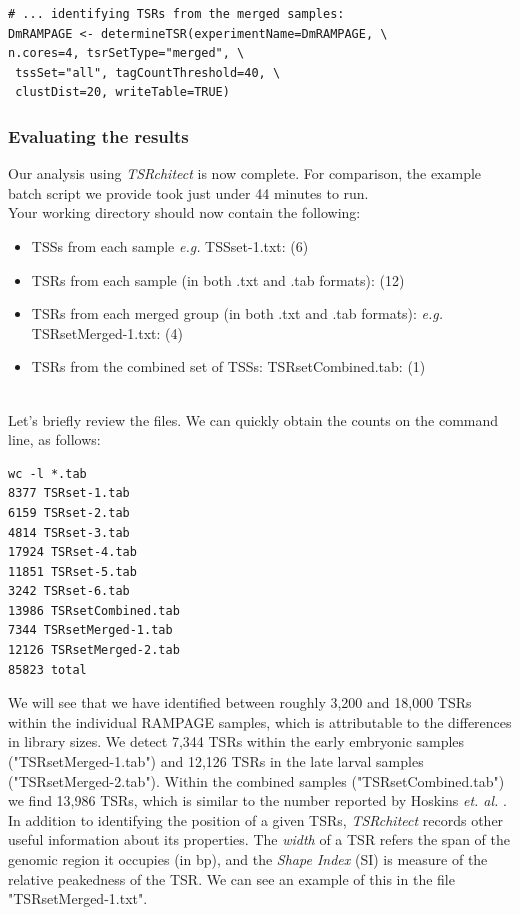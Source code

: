\documentclass[runningheads,a4paper]{llncs}
\begin{document}
\begin{linenumbers}
\begin{verbatim}
# ... identifying TSRs from the merged samples:
DmRAMPAGE <- determineTSR(experimentName=DmRAMPAGE, \
n.cores=4, tsrSetType="merged", \
 tssSet="all", tagCountThreshold=40, \
 clustDist=20, writeTable=TRUE)
\end{verbatim}

\subsubsection{Evaluating the results}
Our analysis using \textit{TSRchitect} is now complete.
For comparison, the example batch script we provide took just under 44 minutes to run.\\
Your working directory should now contain the following:
\begin{itemize}
\item TSSs from each sample \textit{e.g.} TSSset-1.txt: (6)
\item TSRs from each sample (in both .txt and .tab formats): (12)
\item TSRs from each merged group (in both .txt and .tab formats): \textit{e.g.} TSRsetMerged-1.txt: (4)
\item TSRs from the combined set of TSSs: TSRsetCombined.tab: (1)
\end{itemize} \\

Let's briefly review the files. 
We can quickly obtain the counts on the command line, as follows:

\noindent
\begin{verbatim}
wc -l *.tab
8377 TSRset-1.tab
6159 TSRset-2.tab
4814 TSRset-3.tab
17924 TSRset-4.tab
11851 TSRset-5.tab
3242 TSRset-6.tab
13986 TSRsetCombined.tab
7344 TSRsetMerged-1.tab
12126 TSRsetMerged-2.tab
85823 total
\end{verbatim}

We will see that we have identified between roughly 3,200 and 18,000 TSRs within the individual RAMPAGE samples, which is attributable to the differences in library sizes. 
We detect 7,344 TSRs within the early embryonic samples ("TSRsetMerged-1.tab") and 12,126 TSRs in the late larval samples ("TSRsetMerged-2.tab").
Within the combined samples ("TSRsetCombined.tab") we find 13,986 TSRs, which is similar to the number reported by Hoskins \textit{et. al.} \cite{Hoskins:2011io}.\\

In addition to identifying the position of a given TSRs, \textit{TSRchitect} records other useful information about its properties.
The \textit{width} of a TSR refers the span of the genomic region it occupies (in bp), and the \textit{Shape Index} (SI) is measure of the relative peakedness of the TSR.
We can see an example of this in the file "TSRsetMerged-1.txt".


\end{linenumbers}
\end{document}
